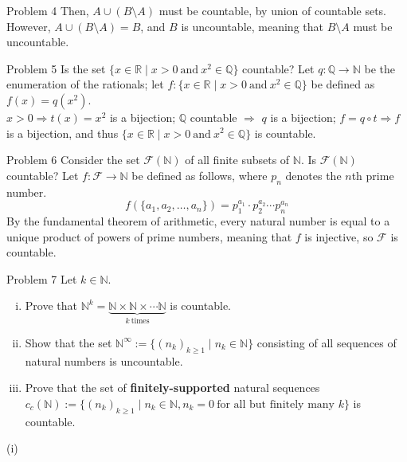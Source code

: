 \documentclass[10pt]{extarticle}
\begin{document}
{\begin{problem}{Problem 4}
    Then, $A\cup (B\setminus A)$ must be countable, by union of countable sets.\\

    However, $A\cup (B\setminus A) = B$, and $B$ is uncountable, meaning that $B\setminus A$ must be uncountable.
  \end{problem}
  \begin{problem}{Problem 5}
    Is the set $\{x\in\mathbb{R} \mid x>0~\textrm{and}~x^2\in\mathbb{Q}\}$ countable?
    \tcblower
    Let $q: \mathbb{Q} \rightarrow \mathbb{N}$ be the enumeration of the rationals; let $f:\{x\in\mathbb{R} \mid x>0~\textrm{and}~x^2\in\mathbb{Q}\}$ be defined as $f(x) = q\left(x^2\right)$.\\

    $x>0 \Rightarrow t(x) = x^2$ is a bijection; $\mathbb{Q}$ countable $\Rightarrow$ $q$ is a bijection; $f = q\circ t \Rightarrow f$ is a bijection, and thus $\{x\in\mathbb{R}\mid x>0~\textrm{and}~x^2\in\mathbb{Q}\}$ is countable.
  \end{problem}
  \begin{problem}{Problem 6}
    Consider the set $\mathcal{F}(\mathbb{N})$ of all finite subsets of $\mathbb{N}$. Is $\mathcal{F}(\mathbb{N})$ countable?
    \tcblower
    Let $f: \mathcal{F} \rightarrow \mathbb{N}$ be defined as follows, where $p_n$ denotes the $n$th prime number.
    \[
      f(\{a_1,a_2,\dots,a_n\}) = p_1^{a_1}\cdot p_2^{a_2}\cdots p_{n}^{a_n}
    \] 
    By the fundamental theorem of arithmetic, every natural number is equal to a unique product of powers of prime numbers, meaning that $f$ is injective, so $\mathcal{F}$ is countable.
  \end{problem}
  \begin{problem}{Problem 7}
    Let $k\in\mathbb{N}$.
    \begin{enumerate}[(i)]
      \item Prove that $\mathbb{N}^k = \underbrace{\mathbb{N}\times\mathbb{N}\times\cdots\mathbb{N}}_{k~\textrm{times}}$ is countable.
      \item Show that the set $\mathbb{N}^{\infty} := \{(n_k)_{k\geq 1}\mid n_k\in \mathbb{N}\}$ consisting of all sequences of natural numbers is uncountable.
      \item Prove that the set of \textbf{finitely-supported} natural sequences $c_c(\mathbb{N}) := \{(n_k)_{k\geq 1} \mid n_k\in\mathbb{N}, n_k=0~\text{for all but finitely many }k\}$ is countable.
    \end{enumerate}
    \tcblower
    \begin{problem}{(i)}

\end{problem}
\end{problem}}
\end{document}
